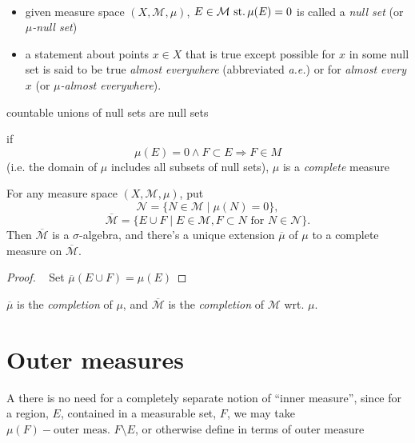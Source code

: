 \begin{defn}\
  \begin{itemize}
  \item given measure space ${(X, \mathcal{M}, \mu)}$,
    ${E\in \mathcal{M}\operatorname{\,st.} \mu(E)=0}$ is called a \emph{null set}
    (or \emph{$\mu$-null set})
  \item a statement about points ${x\in X}$ that is true except
    possible for $x$ in some null set is said to be true
    \emph{almost everywhere} (abbreviated \emph{a.e.}) or for
    \emph{almost every} $x$ (or \emph{$\mu$-almost everywhere}).
  \end{itemize}
\end{defn}

\begin{rem}{}
  countable unions of null sets are null sets
\end{rem}

\begin{defn}
  if
  \[\mu(E)=0\land F\subset E\Rightarrow F\in M \]
  (i.e. the domain of $\mu$ includes all subsets of null sets),
  $\mu$ is a \emph{complete} measure
\end{defn}

\begin{thm}\label{thm:1.9}\label{thm:01:completion-existence}
  For any measure space ${(X, \mathcal{M}, \mu)}$, put
  \[ \mathcal{N} = \{N\in\mathcal{M}\mid\mu(N)=0\}, \]
  \[
  \overline{\mathcal{M}} = \{ E\cup F\mid
  E\in\mathcal{M}, F\subset N\text{ for }N\in\mathcal{N} \}.
  \]
  Then $\overline{\mathcal{M}}$ is a $\sigma$-algebra,
  and there's a unique extension $\overline\mu$ of $\mu$
  to a complete measure on $\overline{\mathcal{M}}$.
\end{thm}
\begin{proof}\
  Set ${\overline\mu(E\cup F) = \mu(E)}$
  \sketch{check well defined}
\end{proof}

\begin{defn}
  $\overline\mu$ is the \emph{completion} of $\mu$,
  and $\overline{\mathcal{M}}$ is
  the \emph{completion} of $\mathcal{M}$ wrt. $\mu$.
\end{defn}

\section{Outer measures}
\begin{rem}{A}
  there is no need for a completely separate notion of
  ``inner measure'', since for a region, $E$, contained in
  a measurable set, $F$, we may take
  ${\mu(F)-\text{outer meas. }F\setminus E}$,
  or otherwise define in terms of outer measure
\end{rem}

